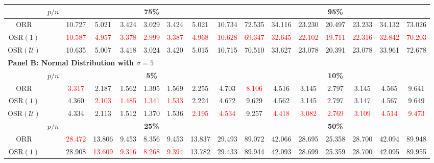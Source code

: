 \begin{table}
{\begin{tabular*}{\textwidth}{@{\extracolsep{\fill}}cc|ccccccc|ccccccc@{}}
\hline
\multicolumn{1}{c}{\textbf{}} & \multicolumn{1}{c|}{\textbf{$p/n$}} & \multicolumn{7}{c|}{\textbf{75\%}} & \multicolumn{7}{c}{\textbf{95\%}} \\
\hline
ORR &  & 10.727 & 5.021 & 3.424 & 3.029 & 3.424 & 5.021 & 10.734 & 72.535 & 34.116 & 23.230 & 20.497 & 23.233 & 34.132 & 73.026 \\
OSR$(1)$ &  & \textcolor{red}{10.587} & \textcolor{red}{4.957} & \textcolor{red}{3.378} & \textcolor{red}{2.999} & \textcolor{red}{3.387} & \textcolor{red}{4.968} & \textcolor{red}{10.628} & \textcolor{red}{69.347} & \textcolor{red}{32.645} & \textcolor{red}{22.102} & \textcolor{red}{19.711} & \textcolor{red}{22.316} & \textcolor{red}{32.842} & \textcolor{red}{70.203} \\
OSR$(\mathcal{U})$ &  & 10.635 & 5.007 & 3.418 & 3.024 & 3.420 & 5.015 & 10.715 & 70.510 & 33.627 & 23.078 & 20.391 & 23.078 & 33.961 & 72.678 \\
\hline
\multicolumn{16}{l}{\textbf{Panel B: Normal Distribution with $\sigma = 5$}} \\
\hline
\multicolumn{1}{c}{\textbf{}} & \multicolumn{1}{c|}{\textbf{$p/n$}} & \multicolumn{7}{c|}{\textbf{5\%}} & \multicolumn{7}{c}{\textbf{10\%}} \\
\hline
ORR &  & \textcolor{red}{3.317} & 2.187 & 1.562 & 1.395 & 1.569 & 2.255 & 4.703 & \textcolor{red}{8.106} & 4.516 & 3.145 & 2.797 & 3.145 & 4.565 & 9.641 \\
OSR$(1)$ &  & 4.360 & \textcolor{red}{2.103} & \textcolor{red}{1.485} & \textcolor{red}{1.341} & \textcolor{red}{1.533} & 2.224 & 4.672 & 9.629 & 4.562 & 3.145 & 2.797 & 3.147 & 4.567 & 9.649 \\
OSR$(\mathcal{U})$ &  & 4.334 & 2.113 & 1.512 & 1.370 & 1.536 & \textcolor{red}{2.195} & \textcolor{red}{4.534} & 9.257 & \textcolor{red}{4.418} & \textcolor{red}{3.082} & \textcolor{red}{2.769} & \textcolor{red}{3.109} & \textcolor{red}{4.514} & \textcolor{red}{9.473} \\
\hline
\multicolumn{1}{c}{\textbf{}} & \multicolumn{1}{c|}{\textbf{$p/n$}} & \multicolumn{7}{c|}{\textbf{25\%}} & \multicolumn{7}{c}{\textbf{50\%}} \\
\hline
ORR &  & \textcolor{red}{28.472} & 13.806 & 9.453 & 8.356 & 9.453 & 13.837 & 29.493 & 89.072 & 42.066 & 28.695 & 25.358 & 28.700 & 42.094 & 89.948 \\
OSR$(1)$ &  & 28.908 & \textcolor{red}{13.609} & \textcolor{red}{9.316} & \textcolor{red}{8.268} & \textcolor{red}{9.394} & 13.782 & 29.433 & 89.944 & 42.093 & 28.699 & 25.359 & 28.700 & 42.095 & 89.955 \\

\end{tabular*}}
\end{table}
